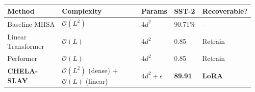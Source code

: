 \begin{table}[H]
\centering
\small
\begin{tabular}{lllll}
\toprule
\textbf{Method} & \textbf{Complexity} & \textbf{Params} & \textbf{SST-2} & \textbf{Recoverable?} \\
\midrule
Baseline MHSA & $\mathcal{O}(L^2)$ & $4d^2$ & 90.71\% & -- \\
Linear Transformer & $\mathcal{O}(L)$ & $4d^2$ & 0.85 & Retrain \\
Performer & $\mathcal{O}(L)$ & $4d^2$ & 0.85 & Retrain \\
\textbf{CHELA-SLAY} & $\mathcal{O}(L^2)$ (dense) + $\mathcal{O}(L)$ (linear) & $4d^2 + \epsilon$ & \textbf{89.91} & \textbf{LoRA} \\
\bottomrule
\end{tabular}
\end{table}

